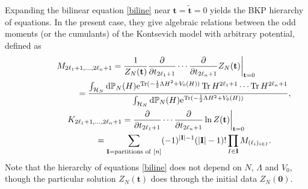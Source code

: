 \documentclass[pdftex]{sigma}
\numberwithin{equation}{section}
\newcommand{\dd}{\mathrm{d}}
\begin{document}
Expanding the bilinear equation \eqref{biline} near $\mathbf{t} = \tilde{\mathbf{t}} = 0$ yields the BKP hierarchy of equations. In the present case, they give algebraic relations between the odd moments (or the cumulants) of the Kontsevich model with arbitrary potential, defined as
\begin{gather*}
M_{2\ell_1 +1 ,\dots,2\ell_n + 1} = \frac{1}{Z_N(\mathbf{t})} \frac{\partial}{\partial t_{2\ell_1 + 1}} \cdots \frac{\partial}{\partial t_{2\ell_n + 1}} Z_N(\mathbf{t}) \bigg|_{\mathbf{t} = 0} \\
\hphantom{M_{2\ell_1 +1 ,\dots,2\ell_n + 1}}{}
 = \frac{\int_{\mathcal{H}_N} \dd\mathbb{P}_N(H) {\rm e}^{{\rm Tr}(-\frac{1}{2}\Lambda H^2 + V_0(H))} \operatorname{Tr}H^{2\ell_1 + 1} \cdots \operatorname{Tr}H^{2\ell_n + 1}}{\int_{\mathcal{H}_N} \dd\mathbb{P}_N(H) {\rm e}^{{\rm Tr}(-\frac{1}{2}\Lambda H^2 + V_0(H))}}, \\
K_{2\ell_1 + 1,\dots,2\ell_n + 1} = \frac{\partial}{\partial t_{2\ell_1 + 1}} \cdots \frac{\partial}{\partial t_{2\ell_n + 1}} \ln Z(\mathbf{t})\bigg|_{\mathbf{t} = 0} \\
\hphantom{K_{2\ell_1 + 1,\dots,2\ell_n + 1}}{}
 = \sum_{\mathbf{I} = {\rm partitions}\,\,{\rm of}\,\,[n]} (-1)^{|\mathbf{I}| - 1}(|\mathbf{I}| - 1)! \prod_{I \in \mathbf{I}} M_{(\ell_i)_{i \in I}}.
\end{gather*}
Note that the hierarchy of equations \eqref{biline} does not depend on $N$, $\Lambda$ and $V_0$, though the particular solution $Z_N(\mathbf{t})$ does through the initial data $Z_N(\mathbf{0})$.
\end{document}
